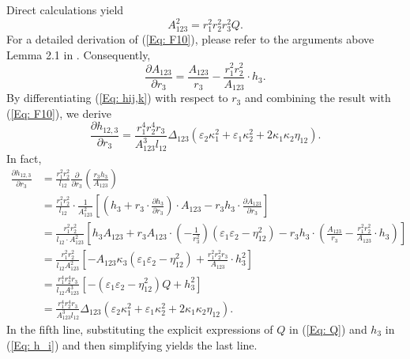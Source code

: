 \documentclass[12pt]{amsart}
\theoremstyle{definition}
\begin{document}
Direct calculations yield
\begin{equation}\label{Eq: F10}
A_{123}^2=r_1^2r_2^2r_3^2Q.
\end{equation}
For a detailed derivation of (\ref{Eq: F10}), please refer to the arguments above Lemma 2.1 in \cite{Xu 1}. Consequently,
\begin{equation*}
\frac{\partial A_{123}}{\partial r_{3}}
=\frac{A_{123}}{r_{3}}-\frac{r_{1}^{2} r_{2}^{2}}{A_{123}} \cdot h_{3}.
\end{equation*}
By differentiating (\ref{Eq: hij,k}) with respect to $r_3$ and combining the result with (\ref{Eq: F10}), we derive
\begin{equation}\label{Eq: F3}
\frac{\partial h_{12,3}}{\partial r_{3}}
=\frac{r_1^4r_2^4r_3}{A_{123}^3l_{12}}\Delta_{123}
(\varepsilon_2\kappa_1^2+\varepsilon_1\kappa_2^2
+2\kappa_1\kappa_2\eta_{12}).
\end{equation}
In fact,
\begin{equation*}
\begin{aligned}
\frac{\partial h_{12,3}}{\partial r_{3}} & =\frac{r_{1}^{2} r_{2}^{2}}{l_{12}} \frac{\partial}{\partial r_{3}}\left(\frac{r_{3} h_{3}}{A_{123}}\right)\\
&=\frac{r_{1}^{2} r_{2}^{2}}{l_{12}} \cdot \frac{1}{A_{123}^{2}}\left[\left(h_{3}+r_{3} \cdot \frac{\partial h_{3}}{\partial r_{3}}\right) \cdot A_{123}-r_{3} h_{3} \cdot \frac{\partial A_{123}}{\partial r_{3}}\right] \\
& =\frac{r_{1}^{2} r_{2}^{2}}{l_{12} \cdot A_{123}^{2}}\left[h_{3} A_{123}+r_{3} A_{123} \cdot\left(-\frac{1}{r_{3}^{2}}\right)\left(\varepsilon_{1} \varepsilon_{2}-\eta_{12}^{2}\right)-r_{3} h_{3} \cdot\left(\frac{A_{123}}{r_{3}}-\frac{r_{1}^{2} r_{2}^{2}}{A_{123}} \cdot h_{3}\right)\right] \\
& =\frac{r_{1}^{2} r_{2}^{2}}{l_{12} A_{123}^{2}}\left[-A_{123} \kappa_{3}\left(\varepsilon_{1} \varepsilon_{2}-\eta_{12}^{2}\right)+\frac{r_{1}^{2} r_{2}^{2} r_{3}}{A_{123}} \cdot h_{3}^{2}\right] \\
& =\frac{r_{1}^4 r_{2}^4r_3}{l_{12} A_{123}^3}\left[-\left(\varepsilon_{1} \varepsilon_{2}-\eta_{12}^{2}\right)Q+h_{3}^{2}\right] \\
&=\frac{r_1^4r_2^4r_3}{A_{123}^3l_{12}}\Delta_{123}
(\varepsilon_2\kappa_1^2+\varepsilon_1\kappa_2^2
+2\kappa_1\kappa_2\eta_{12}).
\end{aligned}
\end{equation*}
In the fifth line, substituting the explicit expressions of $Q$ in (\ref{Eq: Q}) and $h_3$ in (\ref{Eq: h_i}) and then simplifying yields the last line.
\end{document}
